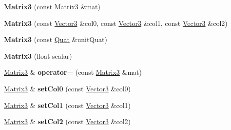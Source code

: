 \begin{DoxyCompactItemize}
{\bfseries Matrix3} (const \hyperlink{classVectormath_1_1Aos_1_1Matrix3}{Matrix3} \&mat)
\item 
\mbox{\label{classVectormath_1_1Aos_1_1Matrix3_a47c615a84dc76eec1c638a6f4641faf3}} 
{\bfseries Matrix3} (const \hyperlink{classVectormath_1_1Aos_1_1Vector3}{Vector3} \&col0, const \hyperlink{classVectormath_1_1Aos_1_1Vector3}{Vector3} \&col1, const \hyperlink{classVectormath_1_1Aos_1_1Vector3}{Vector3} \&col2)
\item 
\mbox{\label{classVectormath_1_1Aos_1_1Matrix3_a255d5b94622e38e8ae4969aacc284dfe}} 
{\bfseries Matrix3} (const \hyperlink{classVectormath_1_1Aos_1_1Quat}{Quat} \&unit\+Quat)
\item 
\mbox{\label{classVectormath_1_1Aos_1_1Matrix3_a54a63372a7b411ef3133f73dc070c13c}} 
{\bfseries Matrix3} (float scalar)
\item 
\mbox{\label{classVectormath_1_1Aos_1_1Matrix3_a48694136c5c7033cf4f8b49fb16e06a3}} 
\hyperlink{classVectormath_1_1Aos_1_1Matrix3}{Matrix3} \& {\bfseries operator=} (const \hyperlink{classVectormath_1_1Aos_1_1Matrix3}{Matrix3} \&mat)
\item 
\mbox{\label{classVectormath_1_1Aos_1_1Matrix3_a0eee935f6ae9d7e2902a03029a6a75b3}} 
\hyperlink{classVectormath_1_1Aos_1_1Matrix3}{Matrix3} \& {\bfseries set\+Col0} (const \hyperlink{classVectormath_1_1Aos_1_1Vector3}{Vector3} \&col0)
\item 
\mbox{\label{classVectormath_1_1Aos_1_1Matrix3_a41773eab66520519f168fff39dfa3a7c}} 
\hyperlink{classVectormath_1_1Aos_1_1Matrix3}{Matrix3} \& {\bfseries set\+Col1} (const \hyperlink{classVectormath_1_1Aos_1_1Vector3}{Vector3} \&col1)
\item 
\mbox{\label{classVectormath_1_1Aos_1_1Matrix3_a5e9b33fec0b8b73de71b9d1e4919f613}} 
\hyperlink{classVectormath_1_1Aos_1_1Matrix3}{Matrix3} \& {\bfseries set\+Col2} (const \hyperlink{classVectormath_1_1Aos_1_1Vector3}{Vector3} \&col2)
\item 
\mbox{\label{classVectormath_1_1Aos_1_1Matrix3_abcbc4a95d29b3deda7c85d0026893300}} 

\end{DoxyCompactItemize}
